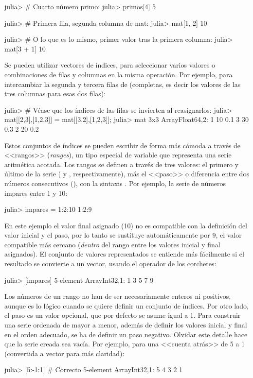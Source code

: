 ﻿\documentclass[spanish]{article}
\begin{document}
julia> # Cuarto número primo:
julia> primos[4]
5

julia> # Primera fila, segunda columna de mat:
julia> mat[1, 2]
10

julia> # O lo que es lo mismo, primer valor tras la primera columna:
julia> mat[3 + 1]
10

Se pueden utilizar vectores de índices, para seleccionar varios valores
o combinaciones de filas y columnas en la misma operación. Por ejemplo,
para intercambiar la segunda y tercera filas de  (completas,
es decir los valores de las tres columnas para esas dos filas):

julia> # Véase que los índices de las filas se invierten al reasignarlos:
julia> mat[[2,3],[1,2,3]] = mat[[3,2],[1,2,3]];
julia> mat
3x3 Array{Float64,2}:
 1 10 0.1
 3 30 0.3
 2 20 0.2

Estos conjuntos de índices se pueden escribir de forma más cómoda
a través de <<rangos>> (\emph{ranges}), un tipo especial de variable
que representa una serie aritmética acotada. Los rangos se definen
a través de tres valores: el primero y último de la serie (
y , respectivamente), más el <<paso>> o diferencia entre
dos números consecutivos (), con la sintaxis .
Por ejemplo, la serie de números impares entre 1 y 10:

julia> impares = 1:2:10
1:2:9

En este ejemplo el valor final asignado (10) no es compatible con
la definición del valor inicial y el paso, por lo tanto se sustituye
automáticamente por 9, el valor compatible más cercano (\emph{dentro}
del rango entre los valores inicial y final asignados). El conjunto
de valores representados se entiende más fácilmente si el resultado
se convierte a un vector, usando el operador de los corchetes:

julia> [impares]
5-element Array{Int32,1}:
 1
 3
 5
 7
 9

Los números de un rango no han de ser necesariamente enteros ni positivos,
aunque es lo lógico cuando se quiere definir un conjunto de índices.
Por otro lado, el paso  es un valor opcional, que por defecto
se asume igual a 1. Para construir una serie ordenada de mayor a menor,
además de definir los valores inicial y final en el orden adecuado,
se ha de definir un paso negativo. Olvidar este detalle hace que la
serie creada sea vacía. Por ejemplo, para una <<cuenta atrás>>
de 5 a 1 (convertida a vector para más claridad):

julia> [5:-1:1] # Correcto
5-element Array{Int32,1}:
 5
 4
 3
 2
 1 
\end{document}
